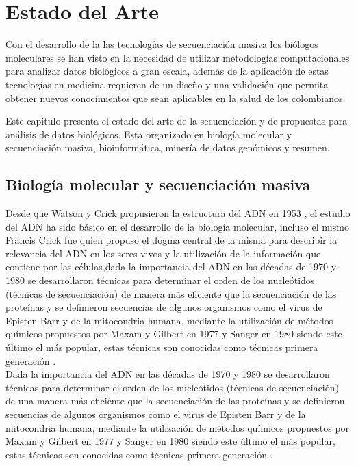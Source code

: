 \chapter{Estado del Arte}

Con el desarrollo de la las tecnologías de secuenciación masiva los biólogos moleculares se han visto en la necesidad  de utilizar metodologías computacionales para analizar datos biológicos a gran escala, además de la aplicación de estas tecnologías en medicina requieren de un diseño y una validación que permita obtener nuevos conocimientos que sean  aplicables en la salud de los colombianos.

Este capítulo presenta el estado del arte de la secuenciación y de propuestas para análisis de datos biológicos. Esta organizado en biología molecular y secuenciación masiva, bioinformática, minería de datos genómicos y resumen. 

\section{Biología molecular y secuenciación masiva}

Desde  que  Watson y Crick propusieron la estructura del ADN en 1953 \cite{Watson1953}, el estudio del ADN ha sido básico en el desarrollo de la biología molecular, incluso el mismo Francis Crick fue quien propuso el dogma central de la misma para describir la relevancia del ADN en los seres vivos y la utilización de la información que contiene por las células,dada la importancia del  ADN  en las décadas de 1970 y 1980 se desarrollaron  técnicas para determinar el orden de los nucleótidos  (técnicas de secuenciación) de manera más eficiente que la secuenciación de las proteínas y se definieron secuencias de algunos organismos como el virus de Episten Barr y  de la mitocondria humana, mediante la utilización de métodos químicos propuestos por Maxam y Gilbert en 1977 y Sanger en 1980 siendo este último el más popular, estas técnicas son conocidas como técnicas primera generación \cite{Herraez2012}. \\

Dada la importancia del  ADN  en las décadas de 1970 y 1980 se desarrollaron  técnicas para determinar el orden de los nucleótidos  (técnicas de secuenciación) de una manera más eficiente que la secuenciación de las proteínas y se definieron secuencias de algunos organismos como el virus de Episten Barr y  de la mitocondria humana, mediante la utilización de métodos químicos propuestos por Maxam y Gilbert en 1977 y Sanger en 1980 siendo este último el más popular, estas técnicas son conocidas como técnicas primera generación \cite{Herraez2012}. \\

